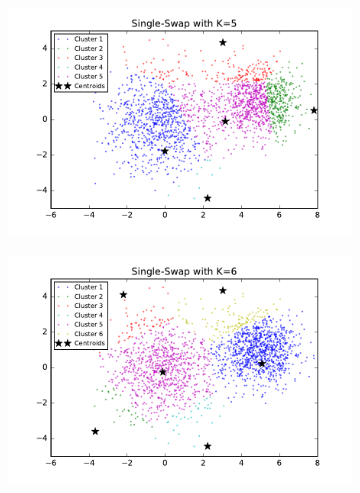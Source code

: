 \begin{description}
\begin{description}
\begin{figure}[!h]
\begin{subfigure}[b]{0.475\textwidth}
        \end{subfigure}
        \begin{subfigure}[b]{0.475\textwidth}  
            \centering 
            \includegraphics[width=\textwidth]{./figures/clustering_singleSwap_5.pdf}
        \end{subfigure}
        \hfill
        \begin{subfigure}[b]{0.475\textwidth}   
            \centering 
            \includegraphics[width=\textwidth]{./figures/clustering_singleSwap_6.pdf}
        \end{subfigure}
        \begin{subfigure}[b]{0.475\textwidth}   
            \centering 

\end{subfigure}
\end{figure}
\end{description}
\end{description}

